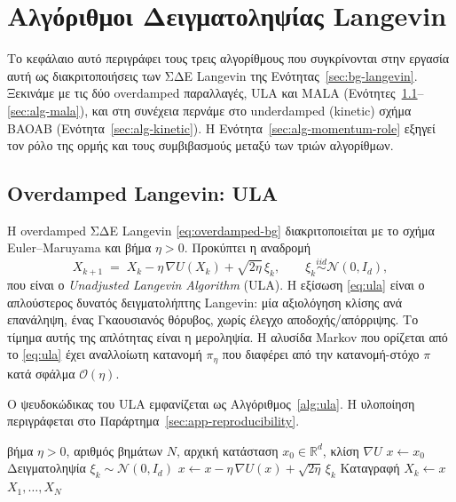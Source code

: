 \chapter{Αλγόριθμοι Δειγματοληψίας Langevin}
\label{chap:algorithms}

Το κεφάλαιο αυτό περιγράφει τους τρεις αλγορίθμους που συγκρίνονται στην
εργασία αυτή ως διακριτοποιήσεις των ΣΔΕ Langevin της
Ενότητας~\ref{sec:bg-langevin}. Ξεκινάμε με τις δύο overdamped παραλλαγές,
ULA και MALA (Ενότητες~\ref{sec:alg-ula}--\ref{sec:alg-mala}), και στη
συνέχεια περνάμε στο underdamped (kinetic) σχήμα BAOAB
(Ενότητα~\ref{sec:alg-kinetic}). Η Ενότητα~\ref{sec:alg-momentum-role}
εξηγεί τον ρόλο της ορμής και τους συμβιβασμούς μεταξύ των τριών αλγορίθμων.

\section{Overdamped Langevin: ULA}
\label{sec:alg-ula}

Η overdamped ΣΔΕ Langevin \eqref{eq:overdamped-bg} διακριτοποιείται με το σχήμα
Euler--Maruyama και βήμα $\eta > 0$. Προκύπτει η αναδρομή
\begin{equation}
  X_{k+1} \;=\; X_k - \eta\, \nabla U(X_k) + \sqrt{2\eta}\, \xi_k,
  \qquad \xi_k \overset{iid}{\sim} \mathcal{N}(0, I_d),
  \label{eq:ula}
\end{equation}
που είναι ο \emph{Unadjusted Langevin Algorithm} (ULA). Η εξίσωση \eqref{eq:ula}
είναι ο απλούστερος δυνατός δειγματολήπτης Langevin: μία αξιολόγηση κλίσης ανά
επανάληψη, ένας Γκαουσιανός θόρυβος, χωρίς έλεγχο αποδοχής/απόρριψης.
Το τίμημα αυτής της απλότητας είναι η μεροληψία. Η αλυσίδα Markov που ορίζεται
από το \eqref{eq:ula} έχει αναλλοίωτη κατανομή $\pi_\eta$ που διαφέρει από την
κατανομή-στόχο $\pi$ κατά σφάλμα $\mathcal{O}(\eta)$.

Ο ψευδοκώδικας του ULA εμφανίζεται ως Αλγόριθμος~\ref{alg:ula}.
Η υλοποίηση περιγράφεται στο Παράρτημα~\ref{sec:app-reproducibility}.

\begin{algorithm}[ht]
\caption{Unadjusted Langevin Algorithm (ULA)}
\label{alg:ula}
\begin{algorithmic}[1]
\Require βήμα $\eta > 0$, αριθμός βημάτων $N$, αρχική κατάσταση $x_0 \in \mathbb{R}^d$, κλίση $\nabla U$
\State $x \gets x_0$
  \State Δειγματοληψία $\xi_k \sim \mathcal{N}(0, I_d)$
  \State $x \gets x - \eta\, \nabla U(x) + \sqrt{2\eta}\, \xi_k$
  \State Καταγραφή $X_k \gets x$
\EndFor
\State \Return $X_1, \ldots, X_N$
\end{algorithmic}
\end{algorithm}

